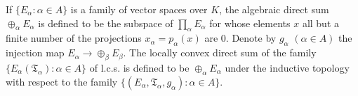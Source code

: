 If $\{E_\alpha : \alpha \in A\}$ is a family of vector spaces over $K$, the algebraic direct sum $\oplus_\alpha E_\alpha$ is defined to be the subspace of $\prod_\alpha E_\alpha$ for whose elements $x$ all but a finite number of the projections $x_\alpha = p_\alpha(x)$ are 0. Denote by $g_\alpha$ $(\alpha \in A)$ the injection map $E_\alpha \rightarrow \oplus_\beta E_\beta$. The locally convex direct sum of the family $\{E_\alpha(\mathfrak{T}_\alpha) : \alpha \in A\}$ of l.c.s. is defined to be $\oplus_\alpha E_\alpha$ under the inductive topology with respect to the family $\{(E_\alpha, \mathfrak{T}_\alpha, g_\alpha) : \alpha \in A\}$.
